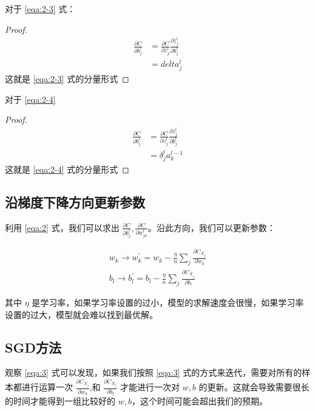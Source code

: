\documentclass{ctexart}
\numberwithin{equation}{section}    %
\begin{document}
对于 \eqref{eqa:2-3} 式：

\begin{proof}
    \begin{equation}
        \begin{aligned}
            \frac{\partial C}{\partial b_j^l}&=\frac{\partial C}{\partial z_j^l}\frac{\partial z_j^l}{\partial b_j^l}\\
            &=delta_j^l
        \end{aligned}
    \end{equation}
    这就是 \eqref{eqa:2-3} 式的分量形式
\end{proof}

对于 \eqref{eqa:2-4}

\begin{proof}
    \begin{equation}
        \begin{aligned}
            \frac{\partial C}{\partial b_j^l}&=\frac{\partial C}{\partial z_j^l}\frac{\partial z_j^l}{\partial b_j^l}\\
            &=\delta_j^la_k^{l-1}
        \end{aligned}
    \end{equation}
    这就是 \eqref{eqa:2-4} 式的分量形式
\end{proof}
\subsection{沿梯度下降方向更新参数}
利用 \eqref{eqa:2} 式，我们可以求出 $\frac{\partial C}{\partial b_{j}^{l}},\frac{\partial C}{\partial w_{j k}^{l}}$。沿此方向，我们可以更新参数：

\begin{equation}
\label{eqa:3}
\begin{aligned}
    w_{k} \rightarrow w_{k}^{\prime}=w_{k}-\frac{\eta}{n} \sum_{j} \frac{\partial C_{X_{j}}}{\partial w_{k}} \\
    b_{l} \rightarrow b_{l}^{\prime}=b_{l}-\frac{\eta}{n} \sum_{j} \frac{\partial C_{X_{j}}}{\partial b_{l}}
    \end{aligned}
\end{equation}

其中 $\eta$ 是学习率，如果学习率设置的过小，模型的求解速度会很慢，如果学习率设置的过大，模型就会难以找到最优解。
\subsection{SGD方法}
观察 \eqref{eqa:3} 式可以发现，如果我们按照 \eqref{eqa:3} 式的方式来迭代，需要对所有的样本都进行运算一次 $\frac{\partial C_{X_{j}}}{\partial w_{k}}$,和 $ \frac{\partial C_{X_{j}}}{\partial b_{l}}$ 才能进行一次对 $w,b$ 的更新。这就会导致需要很长的时间才能得到一组比较好的 $w,b$，这个时间可能会超出我们的预期。
\end{document}

